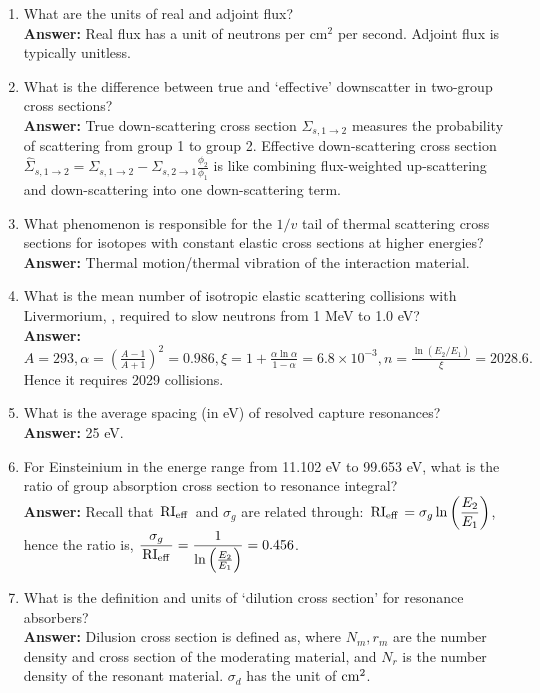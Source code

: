 \documentclass{school-22.211-notes}
\begin{document}
\begin{enumerate}
\begin{enumerate}
  \item What are the units of real and adjoint flux?\\
    \textbf{Answer:} Real flux has a unit of neutrons per cm$^2$ per second. Adjoint flux is typically unitless. 

  \item What is the difference between true and `effective' downscatter in two-group cross sections? \\
    \textbf{Answer:} True down-scattering cross section $\Sigma_{s,1\to 2}$ measures the probability of scattering from group 1 to group 2. Effective down-scattering cross section $\displaystyle \hat{\Sigma}_{s,1\to 2} = \Sigma_{s,1\to 2} - \Sigma_{s, 2 \to 1} \frac{\phi_2}{\phi_1}$ is like combining flux-weighted up-scattering and down-scattering into one down-scattering term. 

  \item What phenomenon is responsible for the $1/v$ tail of thermal scattering cross sections for isotopes with constant elastic cross sections at higher energies?\\
    \textbf{Answer:} Thermal motion/thermal vibration of the interaction material. 

  \item What is the mean number of isotropic elastic scattering collisions with Livermorium, , required to slow neutrons from 1 MeV to 1.0 eV? \\
    \textbf{Answer:} $\displaystyle A = 293, \alpha = \left( \frac{A-1}{A+1} \right)^2 = 0.986, \xi = 1 + \frac{\alpha \ln \alpha}{1 - \alpha} = 6.8 \times 10^{-3}, n = \frac{\ln (E_2 / E_1)}{\xi} = 2028.6.$ Hence it requires 2029 collisions. 

  \item What is the average spacing (in eV) of  resolved capture resonances? \\
    \textbf{Answer:} 25 eV. 

  \item For Einsteinium  in the energe range from 11.102 eV to 99.653 eV, what is the ratio of group absorption cross section to resonance integral? \\
    \textbf{Answer:} Recall that $\left. \mathrm{RI}_{\mathrm{eff}} \right.$ and $\sigma_g$ are related through: $\displaystyle \left. \mathrm{RI}_{\mathrm{eff}} \right. = \sigma_g \ln \left(\frac{E_2}{E_1} \right)$, hence the ratio is, $\displaystyle \frac{\sigma_g}{\left. \mathrm{RI}_{\mathrm{eff}} \right.} = \frac{1}{\ln  \left(\frac{E_2}{E_1} \right) } = 0.456$. 

  \item What is the definition and units of `dilution cross section' for resonance absorbers? \\
    \textbf{Answer:} Dilusion cross section is defined as, 
    where $N_m, r_m$ are the number density and cross section of the moderating material, and $N_r$ is the number density of the resonant material. $\sigma_d$ has the unit of $\mathrm{cm}^2$. 


\end{enumerate}
\end{enumerate}
\end{document}
